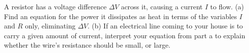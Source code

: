         A resistor has a voltage difference $\Delta V$ across it,
        causing a current $I$ to flow. \hwendpart
        (a) Find an equation for the
        power it dissipates as heat in terms of the variables $I$
        and $R$ only, eliminating $\Delta V$. 
        \answercheck\hwendpart
        (b) If an electrical
        line coming to your house is to carry a given amount of
        current, interpret your equation from part a to explain
        whether the wire's resistance should be small, or large.
